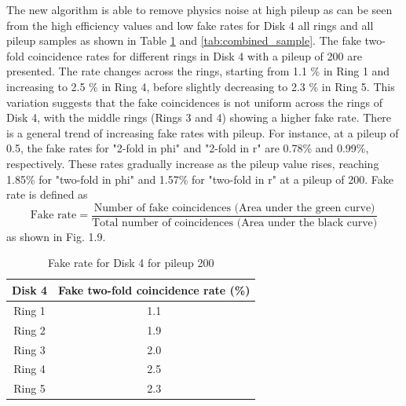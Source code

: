 \newpage
The new algorithm is able to remove physics noise at high pileup as can be seen from the high efficiency values and low fake rates for Disk 4 all rings and all pileup samples as shown in Table  \ref{tab:sample} and \ref{tab:combined_sample}. The fake two-fold coincidence rates for different rings in Disk 4 with a pileup of 200 are presented. The rate changes across the rings, starting from 1.1 \% in Ring 1 and increasing to 2.5 \% in Ring 4, before slightly decreasing to 2.3 \% in Ring 5. This variation suggests that the fake coincidences is not uniform across the rings of Disk 4, with the middle rings (Rings 3 and 4) showing a higher fake rate. There is a general trend of increasing fake rates with pileup. For instance, at a pileup of 0.5, the fake rates for "2-fold in phi" and "2-fold in r" are 0.78\% and 0.99\%, respectively. These rates gradually increase as the pileup value rises, reaching 1.85\% for "two-fold in phi" and 1.57\% for "two-fold in r" at a pileup of 200. Fake rate is defined as\begin{equation}
\text{Fake rate} = \frac{\text{Number of fake coincidences (Area under the green curve)}}{\text{Total number of coincidences (Area under the black curve)}}
\end{equation} as shown in Fig. 1.9.

\begin{table}[H]
  \centering
  \caption{Fake rate for Disk 4 for pileup 200}
  \begin{tabular}{cc}
    \textbf{Disk 4} & \textbf{Fake two-fold coincidence rate (\%)} \\
    \hline
    Ring 1 &  1.1\\
    Ring 2 &  1.9\\
    Ring 3 &  2.0\\
    Ring 4 &  2.5\\
    Ring 5 &  2.3\\
  \end{tabular}
  \label{tab:sample}
\end{table}

